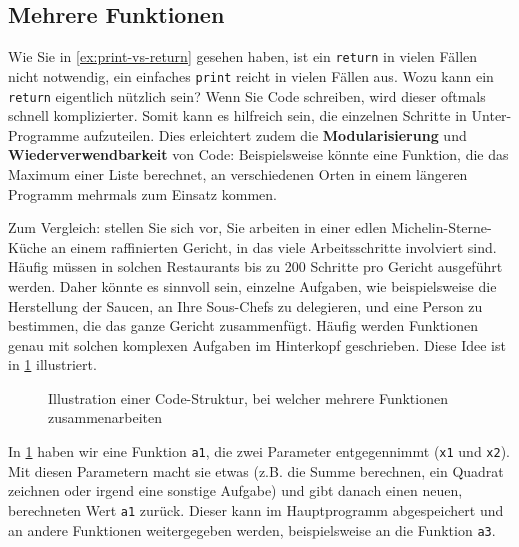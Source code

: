 \subsection{Mehrere Funktionen}
Wie Sie in \cref{ex:print-vs-return} gesehen haben, ist ein \lstinline|return| in vielen Fällen nicht notwendig, ein einfaches \lstinline|print| reicht in vielen Fällen aus. Wozu kann ein \lstinline|return| eigentlich nützlich sein? Wenn Sie Code schreiben, wird dieser oftmals schnell komplizierter. Somit kann es hilfreich sein, die einzelnen Schritte in Unter-Programme aufzuteilen. Dies erleichtert zudem die \textbf{Modularisierung} und \textbf{Wiederverwendbarkeit} von Code: Beispielsweise könnte eine Funktion, die das Maximum einer Liste berechnet, an verschiedenen Orten in einem längeren Programm mehrmals zum Einsatz kommen.

Zum Vergleich: stellen Sie sich vor, Sie arbeiten in einer edlen Michelin-Sterne-Küche an einem raffinierten Gericht, in das viele Arbeitsschritte involviert sind. Häufig müssen in solchen Restaurants bis zu 200 Schritte pro Gericht ausgeführt werden. Daher könnte es sinnvoll sein, einzelne Aufgaben, wie beispielsweise die Herstellung der Saucen, an Ihre Sous-Chefs zu delegieren, und eine Person zu bestimmen, die das ganze Gericht zusammenfügt. Häufig werden Funktionen genau mit solchen komplexen Aufgaben im Hinterkopf geschrieben. Diese Idee ist in \cref{fig:funktionen-mehrere} illustriert.

\begin{figure}[H]
	\centering
	\caption{Illustration einer Code-Struktur, bei welcher mehrere Funktionen zusammenarbeiten}
	\label{fig:funktionen-mehrere}
\end{figure}

In \cref{fig:funktionen-mehrere} haben wir eine Funktion \lstinline|a1|, die zwei Parameter entgegennimmt (\lstinline|x1| und \lstinline|x2|). Mit diesen Parametern macht sie etwas (z.B. die Summe berechnen, ein Quadrat zeichnen oder irgend eine sonstige Aufgabe) und gibt danach einen neuen, berechneten Wert \lstinline|a1| zurück. Dieser kann im Hauptprogramm abgespeichert und an andere Funktionen weitergegeben werden, beispielsweise an die Funktion \lstinline|a3|.


